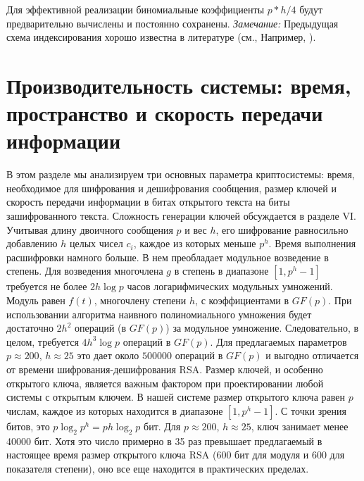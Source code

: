 \documentclass[a4paper,12pt]{article}
\newcommand{\DL}{\newline\newline}
\begin{document}
\begin{algorithmic}[1]
\EndIf
\EndFor
{}
\end{algorithmic}


Для эффективной реализации биномиальные коэффициенты $p*h/4$ будут предварительно вычислены и постоянно сохранены. \newline
\indent \textsl{Замечание: } Предыдущая схема индексирования хорошо известна
в литературе (см., Например, \cite{10}). \DL

\section{Производительность системы: время, пространство и скорость передачи информации}
В этом разделе мы анализируем три основных параметра криптосистемы: время, необходимое для шифрования и дешифрования сообщения, размер ключей и скорость передачи информации в битах открытого текста на биты зашифрованного текста. Сложность генерации ключей обсуждается в разделе VI. \newline
\indent
Учитывая длину двоичного сообщения $p$ и вес $h$, его шифрование равносильно добавлению $h$ целых чисел $c_i$, каждое из которых меньше $p^h$. Время выполнения расшифровки намного больше. В нем преобладает модульное возведение в степень. Для возведения многочлена $g$ в степень в диапазоне $[1, p^h-1]$ требуется не более $2h\log p$ часов логарифмических модульных умножений. Модуль равен $f(t)$, многочлену степени $h$, с коэффициентами в $GF(p)$. При использовании алгоритма наивного полиномиального умножения будет достаточно $2h^2$ операций (в $GF(p)$) за модульное умножение. Следовательно, в целом, требуется $4h^3 \log p$ операций в $GF(p)$. Для предлагаемых параметров $p \approx 200$, $h \approx 25$ это дает около $500000$ операций в $GF(p)$ и выгодно отличается от времени шифрования-дешифрования RSA. \newline
\indent Размер ключей, и особенно открытого ключа, является важным фактором при проектировании любой системы с открытым ключем. В нашей системе размер открытого ключа равен $p$ числам, каждое из которых находится в диапазоне $[1,p^h - 1]$.
С точки зрения битов, это $p \log_2 p^h = ph \log_2 p$ бит. Для $p \approx 200$, $h \approx 25$, ключ занимает менее 40000 бит. Хотя это число примерно в 35 раз превышает предлагаемый в настоящее время размер открытого ключа RSA (600 бит для модуля и 600 для показателя степени), оно все еще находится в практических пределах. \newline
\end{document}
